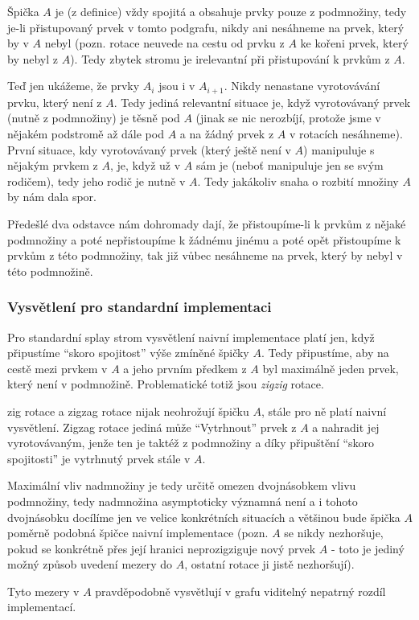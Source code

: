 \documentclass[a4paper,12pt]{article} %
\begin{document}
Špička $A$ je (z definice) vždy spojitá a obsahuje prvky pouze z podmnožiny, tedy je-li přistupovaný prvek v tomto podgrafu, nikdy ani nesáhneme na prvek, který by v $A$ nebyl (pozn. rotace neuvede na cestu od prvku z $A$ ke kořeni prvek, který by nebyl z $A$). Tedy zbytek stromu je irelevantní při přistupování k prvkům z $A$.

Teď jen ukážeme, že prvky $A_i$ jsou i v $A_{i+1}$. Nikdy nenastane vyrotovávání prvku, který není z $A$. Tedy jediná relevantní situace je, když vyrotovávaný prvek (nutně z podmnožiny) je těsně pod $A$ (jinak se nic nerozbíjí, protože jsme v nějakém podstromě až dále pod $A$ a na žádný prvek z $A$ v rotacích nesáhneme). První situace, kdy vyrotovávaný prvek (který ještě není v $A$) manipuluje s nějakým prvkem z $A$, je, když už v $A$ sám je (neboť manipuluje jen se svým rodičem), tedy jeho rodič je nutně v $A$. Tedy jakákoliv snaha o rozbití množiny $A$ by nám dala spor.

Předešlé dva odstavce nám dohromady dají, že přistoupíme-li k prvkům z nějaké podmnožiny a poté nepřistoupíme k žádnému jinému a poté opět přistoupíme k prvkům z této podmnožiny, tak již vůbec nesáhneme na prvek, který by nebyl v této podmnožině.

\subsubsection*{Vysvětlení pro standardní implementaci}

Pro standardní splay strom vysvětlení naivní implementace platí jen, když připustíme ``skoro spojitost'' výše zmíněné špičky $A$. Tedy připustíme, aby na cestě mezi prvkem v $A$ a jeho prvním předkem z $A$ byl maximálně jeden prvek, který není v podmnožině. Problematické totiž jsou \textit{zigzig} rotace.

zig rotace a zigzag rotace nijak neohrožují špičku $A$, stále pro ně platí naivní vysvětlení. Zigzag rotace jediná může ``Vytrhnout'' prvek z $A$ a nahradit jej vyrotovávaným, jenže ten je taktéž z podmnožiny a díky připuštění ``skoro spojitosti'' je vytrhnutý prvek stále v $A$.

Maximální vliv nadmnožiny je tedy určitě omezen dvojnásobkem vlivu podmnožiny, tedy nadmnožina asymptoticky významná není a i tohoto dvojnásobku docílíme jen ve velice konkrétních situacích a většinou bude špička $A$ poměrně podobná špičce naivní implementace (pozn. $A$ se nikdy nezhoršuje, pokud se konkrétně přes její hranici neprozigziguje nový prvek $A$ - toto je jediný možný způsob uvedení mezery do $A$, ostatní rotace ji jistě nezhoršují).

Tyto mezery v $A$ pravděpodobně vysvětlují v grafu viditelný nepatrný rozdíl implementací.
\end{document}

